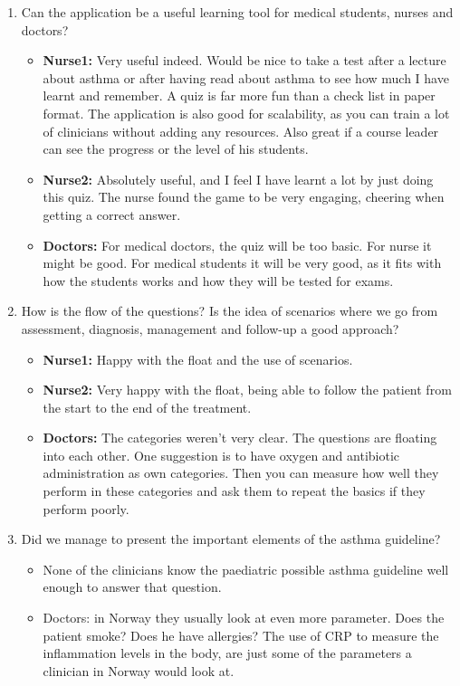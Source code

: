 \begin{enumerate}
	\item Can the application be a useful learning tool for medical students, nurses and doctors?
	\begin{itemize}
		\item \textbf{Nurse1:} Very useful indeed. Would be nice to take a test after a lecture about asthma or after having read about asthma to see how much I have learnt and remember. A quiz is far more fun than a check list in paper format. The application is also good for scalability, as you can train a lot of clinicians without adding any resources. Also great if a course leader can see the progress or the level of his students. 
		\item \textbf{Nurse2:} Absolutely useful, and I feel I have learnt a lot by just doing this quiz. The nurse found the game to be very engaging, cheering when getting a correct answer. 
		\item \textbf{Doctors:} For medical doctors, the quiz will be too basic. For nurse it might be good. For medical students it will be very good, as it fits with how the students works and how they will be tested for exams.
	\end{itemize}
	\item How is the flow of the questions? Is the idea of scenarios where we go from assessment, diagnosis, management and follow-up a good approach?
	\begin{itemize}
		\item \textbf{Nurse1:} Happy with the float and the use of scenarios.
		\item \textbf{Nurse2:} Very happy with the float, being able to follow the patient from the start to the end of the treatment.
		\item \textbf{Doctors:} The categories weren't very clear. The questions are floating into each other. One suggestion is to have oxygen and antibiotic administration as own categories. Then you can measure how well they perform in these categories and ask them to repeat the basics if they perform poorly.
	\end{itemize}
	\item Did we manage to present the important elements of the asthma guideline?
	\begin{itemize}
		\item None of the clinicians know the paediatric possible asthma guideline \parencite{RepublicofKeny2016} well enough to answer that question.
		\item {Doctors:} in Norway they usually look at even more parameter. Does the patient smoke? Does he have allergies? The use of CRP to measure the inflammation levels in the body, are just some of the parameters a clinician in Norway would look at.

\end{itemize}
\end{enumerate}
